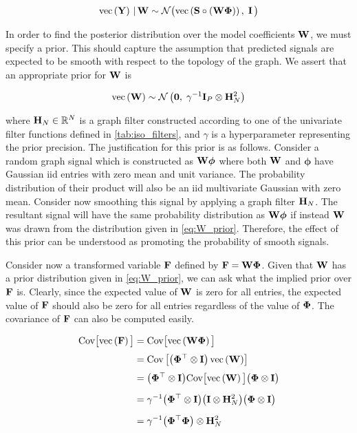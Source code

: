 \begin{equation}
    \text{\textup{vec}}\left(\mathbf{Y}\right) \, | \, \mathbf{W} \sim \mathcal{N}\big( \text{\textup{vec}}\left(\mathbf{S} \circ (\mathbf{W} \mathbf{\Phi})\right), \; \mathbf{I} \, \big)
\end{equation}

In order to find the posterior distribution over the model coefficients $\mathbf{W}$, we must specify a prior. This should capture the assumption that predicted signals are expected to be smooth with respect to the topology of the graph. We assert that an appropriate prior for $\mathbf{W}$ is 

\begin{equation}
    \label{eq:W_prior}
    \text{\textup{vec}}\left(\mathbf{W}\right) \sim \mathcal{N}\left(\mathbf{0}, \; \gamma^{-1} \mathbf{I}_P \otimes \mathbf{H}_N^{2}\right)
\end{equation}

where $\mathbf{H}_N \in \mathbb{R}^{N}$ is a graph filter constructed according to one of the univariate filter functions defined in \cref{tab:iso_filters}, and $\gamma$ is a hyperparameter representing the prior precision. The justification for this prior is as follows. Consider a random graph signal which is constructed as $\mathbf{W} \boldsymbol{\phi}$ where both $\mathbf{W}$ and $\boldsymbol{\phi}$ have Gaussian iid entries with zero mean and unit variance. The probability distribution of their product will also be an iid multivariate Gaussian with zero mean. Consider now smoothing this signal by applying a graph filter $\mathbf{H}_N$. The resultant signal will have the same probability distribution as $\mathbf{W} \boldsymbol{\phi}$ if instead $\mathbf{W}$ was drawn from the distribution given in \cref{eq:W_prior}. Therefore, the effect of this prior can be understood as promoting the probability of smooth signals. 


Consider now a transformed variable $\mathbf{F}$ defined by $\mathbf{F} = \mathbf{W} \mathbf{\Phi}$. Given that $\mathbf{W}$ has a prior distribution given in \cref{eq:W_prior}, we can ask what the implied prior over $\mathbf{F}$ is. Clearly, since the expected value of $\mathbf{W}$ is zero for all entries, the expected value of $\mathbf{F}$ should also be zero for all entries regardless of the value of $\mathbf{\Phi}$. The covariance of $\mathbf{F}$ can also be computed easily. 

\begin{align*}
    \text{Cov}\big[\text{\textup{vec}}\left(\mathbf{F}\right)\big] &= \text{Cov}\big[\text{\textup{vec}}\left(\mathbf{W} \mathbf{\Phi}\right)\big] \\[0.1cm]
    &= \text{Cov}\left[\big(\mathbf{\Phi}^\top \otimes \mathbf{I}\big) \, \text{\textup{vec}}\left(\mathbf{W}\right)\right] \\[0.1cm]
    &= \big(\mathbf{\Phi}^\top \otimes \mathbf{I}\big) \text{Cov}\big[\text{\textup{vec}}\left(\mathbf{W}\right)\big] \big(\mathbf{\Phi} \otimes \mathbf{I}\big) \\[0.2cm]
    &= \gamma^{-1}  \big(\mathbf{\Phi}^\top \otimes \mathbf{I}\big) \big(\mathbf{I} \otimes \mathbf{H}_N^{2} \big) \big(\mathbf{\Phi} \otimes \mathbf{I}\big) \\[0.2cm]
    &= \gamma^{-1} \big( \mathbf{\Phi}^\top \mathbf{\Phi} \big) \otimes \mathbf{H}_N^2
\end{align*}

